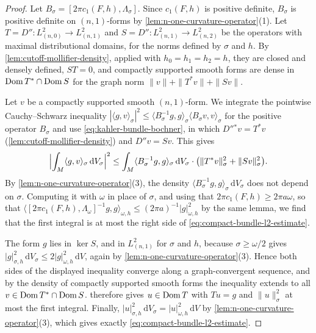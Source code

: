 \begin{proof}
Let $B_\sigma=[2\pi c_1(F,h),\Lambda_\sigma]$. Since $c_1(F,h)$ is positive definite, $B_\sigma$ is positive definite on $(n,1)$-forms by \cref{lem:n-one-curvature-operator}(1). Let $T=D''\colon L^2_{(n,0)}\to L^2_{(n,1)}$ and $S=D''\colon L^2_{(n,1)}\to L^2_{(n,2)}$ be the operators with maximal distributional domains, for the norms defined by $\sigma$ and $h$. By \cref{lem:cutoff-mollifier-density}, applied with $h_0=h_1=h_2=h$, they are closed and densely defined, $ST=0$, and compactly supported smooth forms are dense in $\operatorname{Dom} T^*\cap\operatorname{Dom} S$ for the graph norm $\|v\|+\|T^*v\|+\|Sv\|$.

Let $v$ be a compactly supported smooth $(n,1)$-form. We integrate the pointwise Cauchy--Schwarz inequality $|\langle g,v\rangle_\sigma|^2\leq\langle B_\sigma^{-1}g,g\rangle_\sigma\langle B_\sigma v,v\rangle_\sigma$ for the positive operator $B_\sigma$ and use \eqref{eq:kahler-bundle-bochner}, in which $D''{}^*v=T^*v$ (\cref{lem:cutoff-mollifier-density}) and $D''v=Sv$. This gives
\[
 \Bigl|\int_M\langle g,v\rangle_\sigma\,\mathrm dV_\sigma\Bigr|^2
 \leq\int_M\langle B_\sigma^{-1}g,g\rangle_\sigma\,\mathrm dV_\sigma\cdot\bigl(\|T^*v\|_\sigma^2+\|Sv\|_\sigma^2\bigr).
\]
By \cref{lem:n-one-curvature-operator}(3), the density $\langle B_\sigma^{-1}g,g\rangle_\sigma\,\mathrm dV_\sigma$ does not depend on $\sigma$. Computing it with $\omega$ in place of $\sigma$, and using that $2\pi c_1(F,h)\geq2\pi a\omega$, so that $\langle[2\pi c_1(F,h),\Lambda_\omega]^{-1}g,g\rangle_{\omega,h}\leq(2\pi a)^{-1}|g|_{\omega,h}^2$ by the same lemma, we find that the first integral is at most the right side of \eqref{eq:compact-bundle-l2-estimate}.

The form $g$ lies in $\ker S$, and in $L^2_{(n,1)}$ for $\sigma$ and $h$, because $\sigma\geq\omega/2$ gives $|g|_{\sigma,h}^2\,\mathrm dV_\sigma\leq2|g|_{\omega,h}^2\,\mathrm dV$, again by \cref{lem:n-one-curvature-operator}(3). Hence both sides of the displayed inequality converge along a graph-convergent sequence, and by the density of compactly supported smooth forms the inequality extends to all $v\in\operatorname{Dom} T^*\cap\operatorname{Dom} S$.  therefore gives $u\in\operatorname{Dom} T$ with $Tu=g$ and $\|u\|_\sigma^2$ at most the first integral. Finally, $|u|_{\sigma,h}^2\,\mathrm dV_\sigma=|u|_{\omega,h}^2\,\mathrm dV$ by \cref{lem:n-one-curvature-operator}(3), which gives exactly \eqref{eq:compact-bundle-l2-estimate}.
\end{proof}

